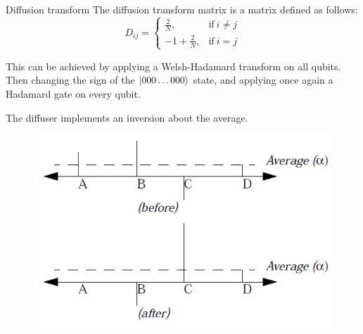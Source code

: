 \documentclass[11p,aspectratio=169]{beamer}
\begin{document}
\begin{frame}{Diffusion transform}
    The diffusion transform matrix is a matrix defined as follows:
    \begin{equation}
        D_{ij }=
        \begin{cases}
          \frac{2}{N}, & \text{if}\ i \neq j \\
          - 1 + \frac{2}{N}, & \text{if}\ i = j
        \end{cases}
      \end{equation}

      This can be achieved by applying a Welsh-Hadamard transform on all qubits. Then changing the sign of the $\ket{000 \ldots 000}$
state, and applying once again a Hadamard gate on every qubit.

The diffuser implements an inversion about the average.
\begin{figure}
    \centering
    \includegraphics[height= 0.4 \textheight]{figures/inversion.png}
\end{figure}
    
\end{frame}
\end{document}
